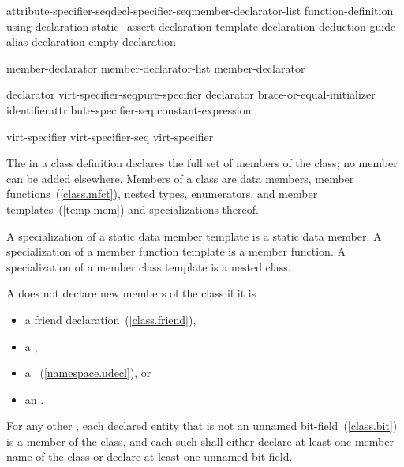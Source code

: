 \begin{bnf}
\br
    attribute-specifier-seq\opt decl-specifier-seq\opt member-declarator-list\opt{} \terminal{;}\br
    function-definition\br
    using-declaration\br
    static_assert-declaration\br
    template-declaration\br
    deduction-guide\br
    alias-declaration\br
    empty-declaration
\end{bnf}

\begin{bnf}
\br
    member-declarator\br
    member-declarator-list \terminal{,} member-declarator
\end{bnf}

\begin{bnf}
\br
    declarator virt-specifier-seq\opt pure-specifier\opt\br
    declarator brace-or-equal-initializer\opt\br
    identifier\opt attribute-specifier-seq\opt{} \terminal{:} constant-expression
\end{bnf}

\begin{bnf}
\br
    virt-specifier\br
    virt-specifier-seq virt-specifier
\end{bnf}

\begin{bnf}
\br
    \br
\end{bnf}

\begin{bnf}
\br
\end{bnf}

\pnum
{}%
The  in a class definition declares the
full set of members of the class; no member can be added elsewhere.
Members of a class are data members, member
functions~(\ref{class.mfct}), nested types, enumerators,
and member templates~(\ref{temp.mem}) and specializations thereof.
\begin{note}
A specialization of a static data member template is a static data member.
A specialization of a member function template is a member function.
A specialization of a member class template is a nested class.
\end{note}

\pnum
A  does not declare new members of the class
if it is
\begin{itemize}
\item a friend declaration~(\ref{class.friend}),
\item a ,
\item a ~(\ref{namespace.udecl}), or
\item an .
\end{itemize}
For any other ,
each declared entity
that is not an unnamed bit-field~(\ref{class.bit})
is a member of the class,
and each such 
shall either
declare at least one member name of the class
or declare at least one unnamed bit-field.

